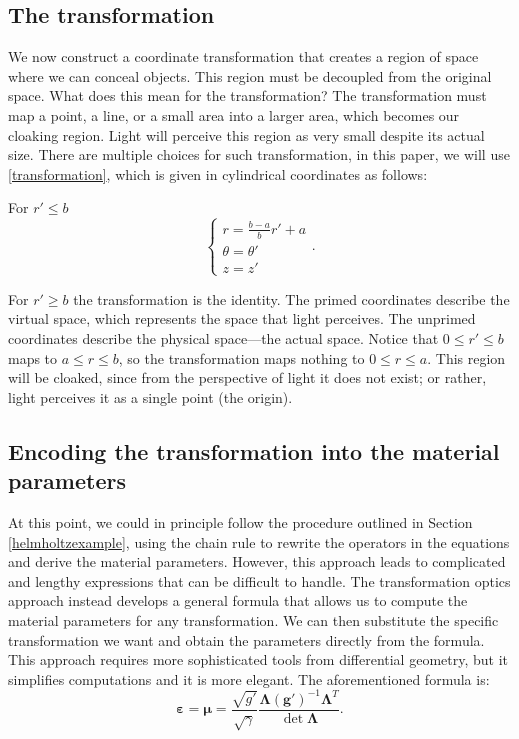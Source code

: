 \subsection{The transformation}

We now construct a coordinate transformation that
creates a region of space where we can conceal objects. This region
must be decoupled from the original space. What does this
mean for the transformation? The transformation must map
a point, a line, or a small area into a larger area, which becomes our
cloaking region. Light will perceive this region as very small despite its
actual size. There are multiple choices for such transformation, in this paper,
we will use \eqref{transformation}, which is given in cylindrical coordinates
as follows:

For \(r'\leq b\)
\begin{equation}\label{transformation}
\begin{cases}
	r= \frac{b-a}{b} r' + a\\
	\theta = \theta'\\
	z=z'
\end{cases}.
\end{equation}

For \(r'\geq b\) the transformation is the identity. The primed coordinates
describe the virtual space, which represents the space that light perceives.
The unprimed coordinates describe the physical space---the actual space. Notice
that \(0\leq r'\leq b\) maps to \(a\leq r\leq b\), so the transformation maps
nothing to \(0\leq r \leq a\). This region will be cloaked, since from the
perspective of light it does not exist; or rather, light perceives it as a
single point (the origin).

\subsection{Encoding the transformation into the material parameters}

At this point, we could in principle follow the procedure outlined in Section
\ref{helmholtzexample}, using the chain rule to rewrite the operators in the
equations and derive the material parameters. However, this approach leads
to complicated and lengthy expressions that can be difficult to handle. The
transformation optics approach instead develops a general formula that
allows us to compute the material parameters for any transformation. We can
then substitute the specific transformation we want and obtain the parameters
directly from the formula. This approach requires more sophisticated tools from
differential geometry, but it simplifies computations and it is more elegant.
The aforementioned formula is:
\begin{equation}\label{formula}
\boldsymbol{\varepsilon}=\boldsymbol{\mu}=
\frac{\sqrt{g'}}{\sqrt{\gamma}}\frac{\boldsymbol{\Lambda}
\left(\boldsymbol{g}'\right)^{-1}\boldsymbol{\Lambda}^T}{\det\boldsymbol{\Lambda}}.
\end{equation}
